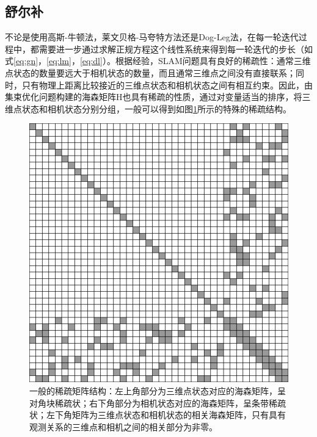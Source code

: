 

\subsection{舒尔补}\label{sec:schur}

不论是使用高斯-牛顿法，莱文贝格-马夸特方法还是Dog-Leg法，在每一轮迭代过程中，都需要进一步通过求解正规方程这个线性系统来得到每一轮迭代的步长（如式\eqref{eq:gn}，\eqref{eq:lm}，\eqref{eq:dl}）。根据经验，SLAM问题具有良好的稀疏性：通常三维点状态的数量要远大于相机状态的数量，而且通常三维点之间没有直接联系；同时，只有物理上距离比较接近的三维点状态和相机状态之间有相互约束。因此，由集束优化问题构建的海森矩阵$\mathrm{H}$也具有稀疏的性质，通过对变量适当的排序，将三维点状态和相机状态分别分组，一般可以得到如图\ref{fig:sparse_matrix}所示的特殊的稀疏结构。

\begin{figure}[htb!]
    \centering
    \includegraphics[width=.5\textwidth]{figs/sparse_matrix.png}
    \caption{一般的稀疏矩阵结构：左上角部分为三维点状态对应的海森矩阵，呈对角块稀疏状；右下角部分为相机状态对应的海森矩阵，呈条带稀疏状；左下角矩阵为三维点状态和相机状态的相关海森矩阵，只有具有观测关系的三维点和相机之间的相关部分为非零。}
    \label{fig:sparse_matrix}
\end{figure}

